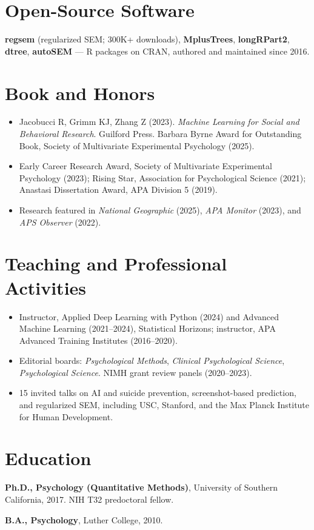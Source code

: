 \documentclass[10pt,letterpaper]{article}
\begin{document}
\section{Open-Source Software}
\textbf{regsem} (regularized SEM; 300K+ downloads), \textbf{MplusTrees}, \textbf{longRPart2}, \textbf{dtree}, \textbf{autoSEM} --- R packages on CRAN, authored and maintained since 2016.

\section{Book and Honors}
\begin{itemize}
\item Jacobucci R, Grimm KJ, Zhang Z (2023). \textit{Machine Learning for Social and Behavioral Research}. Guilford Press. Barbara Byrne Award for Outstanding Book, Society of Multivariate Experimental Psychology (2025).
\item Early Career Research Award, Society of Multivariate Experimental Psychology (2023); Rising Star, Association for Psychological Science (2021); Anastasi Dissertation Award, APA Division 5 (2019).
\item Research featured in \textit{National Geographic} (2025), \textit{APA Monitor} (2023), and \textit{APS Observer} (2022).
\end{itemize}

\section{Teaching and Professional Activities}
\begin{itemize}
\item Instructor, Applied Deep Learning with Python (2024) and Advanced Machine Learning (2021--2024), Statistical Horizons; instructor, APA Advanced Training Institutes (2016--2020).
\item Editorial boards: \textit{Psychological Methods}, \textit{Clinical Psychological Science}, \textit{Psychological Science}. NIMH grant review panels (2020--2023).
\item 15 invited talks on AI and suicide prevention, screenshot-based prediction, and regularized SEM, including USC, Stanford, and the Max Planck Institute for Human Development.
\end{itemize}

\section{Education}
\textbf{Ph.D., Psychology (Quantitative Methods)}, University of Southern California, 2017. NIH T32 predoctoral fellow.\par
\textbf{B.A., Psychology}, Luther College, 2010.
\end{document}
